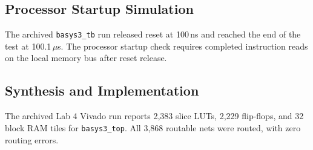 \subsection{Processor Startup Simulation}

The archived \texttt{basys3\_tb} run released reset at 100\,ns and reached
the end of the test at 100.1\,$\mu$s. The processor startup check requires
completed instruction reads on the local memory bus after reset release.


\subsection{Synthesis and Implementation}

The archived Lab 4 Vivado run reports 2,383 slice LUTs, 2,229 flip-flops,
and 32 block RAM tiles for \texttt{basys3\_top}. All 3,868 routable nets
were routed, with zero routing errors.
